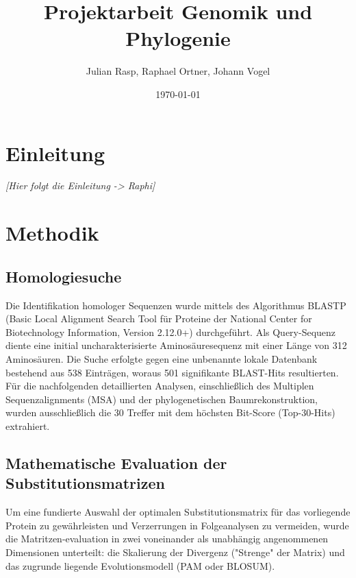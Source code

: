 \documentclass[11pt, a4paper]{article}
\begin{document}
\title{Projektarbeit Genomik und Phylogenie}
\author{Julian Rasp, Raphael Ortner, Johann Vogel}
\date{\today}

\maketitle
\setcounter{page}{0}
\thispagestyle{empty}
\vspace{50}
\tableofcontents


\newpage
\section{Einleitung}
\textit{[Hier folgt die Einleitung -> Raphi]}

\section{Methodik}

\subsection{Homologiesuche}
Die Identifikation homologer Sequenzen wurde mittels des Algorithmus BLASTP (Basic Local Alignment Search Tool für Proteine der National Center for Biotechnology Information, Version 2.12.0+) durchgeführt. Als Query-Sequenz diente eine initial uncharakterisierte Aminosäuresequenz mit einer Länge von 312 Aminosäuren. Die Suche erfolgte gegen eine unbenannte lokale Datenbank bestehend aus 538 Einträgen, woraus 501 signifikante BLAST-Hits resultierten. Für die nachfolgenden detaillierten Analysen, einschließlich des Multiplen Sequenzalignments (MSA) und der phylogenetischen Baumrekonstruktion, wurden ausschließlich die 30 Treffer mit dem höchsten Bit-Score (Top-30-Hits) extrahiert.

\subsection{Mathematische Evaluation der Substitutionsmatrizen}
Um eine fundierte Auswahl der optimalen Substitutionsmatrix für das vorliegende Protein zu gewährleisten und Verzerrungen in Folgeanalysen zu vermeiden, wurde die Matritzen-evaluation in zwei voneinander als unabhängig angenommenen Dimensionen unterteilt: 
die Skalierung der Divergenz ("Strenge" der Matrix) und das zugrunde liegende Evolutionsmodell (PAM oder BLOSUM).
\end{document}

